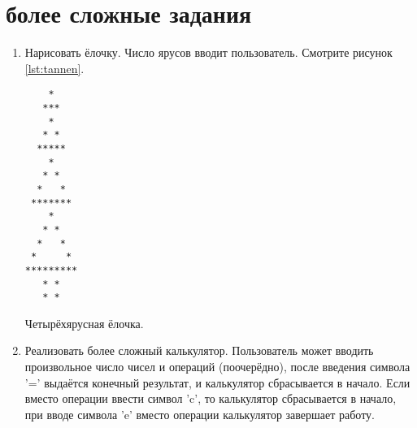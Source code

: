 \documentclass[12pt]{article}
\begin{document}
 \section{более сложные задания}
 \begin{enumerate}
  \item Нарисовать ёлочку. Число ярусов вводит пользователь. Смотрите рисунок \ref{lst:tannen}.
\begin{listing}[h]
\begin{center}
\begin{verbatim}
    *
   ***
    *
   * *
  *****
    *
   * *
  *   *
 *******
    *
   * *
  *   *
 *     *
*********
   * *
   * *
\end{verbatim}
\end{center}

\caption{Четырёхярусная ёлочка.}
\label{lst:tannen}
\end{listing}

  \item Реализовать более сложный калькулятор. Пользователь может вводить произвольное число чисел и операций (поочерёдно), после введения символа '=' выдаётся конечный результат, и калькулятор сбрасывается в начало. Если вместо операции ввести символ 'c', то калькулятор сбрасывается в начало, при вводе символа 'e' вместо операции калькулятор завершает работу.  
 \end{enumerate}
\end{document}
